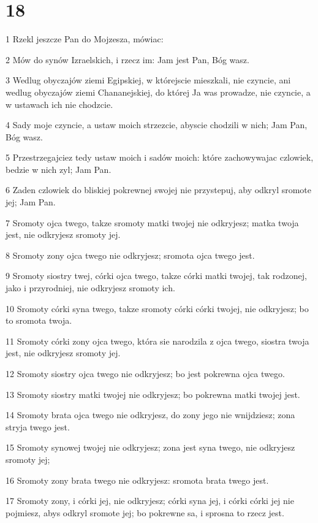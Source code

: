 \chapter{18}

\par 1 Rzekl jeszcze Pan do Mojzesza, mówiac:
\par 2 Mów do synów Izraelskich, i rzecz im: Jam jest Pan, Bóg wasz.
\par 3 Wedlug obyczajów ziemi Egipskiej, w którejscie mieszkali, nie czyncie, ani wedlug obyczajów ziemi Chananejskiej, do której Ja was prowadze, nie czyncie, a w ustawach ich nie chodzcie.
\par 4 Sady moje czyncie, a ustaw moich strzezcie, abyscie chodzili w nich; Jam Pan, Bóg wasz.
\par 5 Przestrzegajciez tedy ustaw moich i sadów moich: które zachowywajac czlowiek, bedzie w nich zyl; Jam Pan.
\par 6 Zaden czlowiek do bliskiej pokrewnej swojej nie przystepuj, aby odkryl sromote jej; Jam Pan.
\par 7 Sromoty ojca twego, takze sromoty matki twojej nie odkryjesz; matka twoja jest, nie odkryjesz sromoty jej.
\par 8 Sromoty zony ojca twego nie odkryjesz; sromota ojca twego jest.
\par 9 Sromoty siostry twej, córki ojca twego, takze córki matki twojej, tak rodzonej, jako i przyrodniej, nie odkryjesz sromoty ich.
\par 10 Sromoty córki syna twego, takze sromoty córki córki twojej, nie odkryjesz; bo to sromota twoja.
\par 11 Sromoty córki zony ojca twego, która sie narodzila z ojca twego, siostra twoja jest, nie odkryjesz sromoty jej.
\par 12 Sromoty siostry ojca twego nie odkryjesz; bo jest pokrewna ojca twego.
\par 13 Sromoty siostry matki twojej nie odkryjesz; bo pokrewna matki twojej jest.
\par 14 Sromoty brata ojca twego nie odkryjesz, do zony jego nie wnijdziesz; zona stryja twego jest.
\par 15 Sromoty synowej twojej nie odkryjesz; zona jest syna twego, nie odkryjesz sromoty jej;
\par 16 Sromoty zony brata twego nie odkryjesz: sromota brata twego jest.
\par 17 Sromoty zony, i córki jej, nie odkryjesz; córki syna jej, i córki córki jej nie pojmiesz, abys odkryl sromote jej; bo pokrewne sa, i sprosna to rzecz jest.
